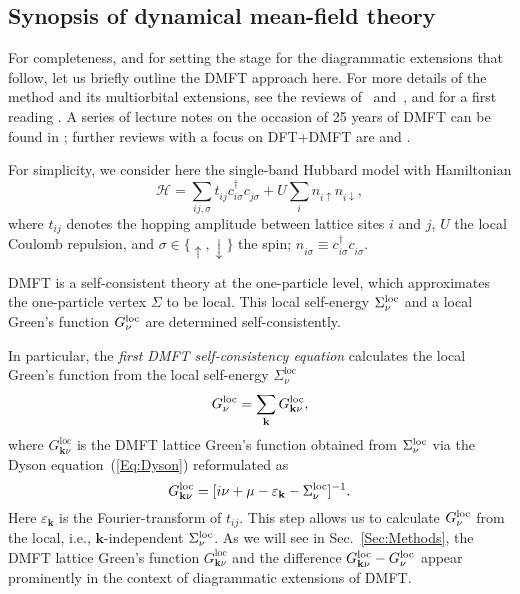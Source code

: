 \documentclass[rmp,aps,reprint,amsmath,amssymb,superscriptaddress,showpacs,nofootinbib]{revtex4-1}
\begin{document}
\subsection{Synopsis of dynamical mean-field theory}
\label{sec:dmft}

For completeness, and for setting the stage for the diagrammatic extensions that follow, let us briefly outline the DMFT approach here. For more details of the method and its multiorbital extensions, see the reviews of~ and~, and for a first reading . A series of lecture notes on the occasion of 25 years of DMFT can be found in ;  further reviews with a focus on DFT+DMFT are  and .

For simplicity, we consider here the single-band Hubbard model with Hamiltonian
\begin{equation}
\label{Eq:Hubbard}
  \mathcal{H} = \sum_{ij,\sigma} t_{ij}^{\phantom{\dagger}} c_{i\sigma}^{\dagger}c_{j\sigma}^{\phantom{\dagger}} + U\sum_{i}n^{\phantom{\dagger}}_{i\uparrow}n^{\phantom{\dagger}}_{i\downarrow},
\end{equation}
where $t_{ij}$ denotes the hopping amplitude between lattice sites $i$ and $j$,  $U$ the local Coulomb repulsion,  and  $\sigma \in\{{\uparrow,} \downarrow\}$  the spin; $n^{\phantom{\dagger}}_{i\sigma}\equiv c_{i\sigma}^{\dagger}c^{\phantom{\dagger}}_{i\sigma}$.

DMFT is a self-consistent theory at the  one-particle level, which approximates the  one-particle vertex  $\Sigma$ to be local. This local self-energy  $\Sigma^{\rm loc}_\nu$ and a local Green's function  $G^{\rm loc}_\nu$  are determined  self-consistently.

In particular, the {\em first DMFT self-consistency equation} calculates the local Green's function from the local self-energy $\Sigma_\nu^{\text{loc}}$
\begin{equation}
  G^{\rm loc}_\nu = \sum_{\mathbf k} G^{\text{loc}}_{\mathbf{k}\nu},
\end{equation}
where $G^{\text{loc}}_{\mathbf{k}\nu}$ is the DMFT lattice Green's function obtained from  $\Sigma^{\rm loc}_\nu$ via the Dyson equation~(\ref{Eq:Dyson}) reformulated as
\begin{equation}
\label{equ:defDMFTgf}
  G^{\text{loc}}_{\mathbf{k}\nu} =  [i\nu + \mu -\varepsilon_{\mathbf k} - \Sigma^{\rm loc}_\nu]^{-1}.
\end{equation}
Here $\varepsilon_{\mathbf k}$ is the Fourier-transform of  $t_{ij}$. This step allows us to calculate $G^{\rm loc}_\nu$ from the local, i.e.,  ${\mathbf k}$-independent $\Sigma^{\rm loc}_\nu$. As we will see in Sec.~\ref{Sec:Methods}, the DMFT lattice Green's function $G_{\mathbf{k}\nu}^\text{loc}$ and the difference $G^{\text{loc}}_{\mathbf{k}\nu}-G^{\rm loc}_\nu$ appear prominently in the context of diagrammatic extensions of DMFT.
\end{document}
